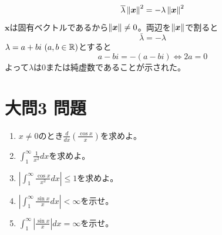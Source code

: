 \documentclass[dvipdfmx]{jsreport}
\begin{document}
\begin{souanswer}
\begin{enumerate}
\begin{equation*}
	\overline{\lambda}\left\|\bm{x}\right\|^2= -\lambda\left\|\bm{x}\right\|^2
\end{equation*}
	$\bm{x}$は固有ベクトルであるから$\left\|\bm{x}\right\|\ne 0$。両辺を$\left\|\bm{x}\right\|$で割ると
\begin{equation*}
	\bar{\lambda}= -\lambda
\end{equation*}
	$\lambda= a+ bi\ (a, b\in \mathbb{R})$とすると
\begin{equation*}
	a- bi= -(a- bi)\Leftrightarrow 2a= 0
\end{equation*}
	よって$\lambda$は0または純虚数であることが示された。
\end{enumerate}
\end{souanswer}

\section{大問3 問題}
\begin{tcolorbox} %
\begin{enumerate}
	\item $x\ne 0$のとき$\frac{d}{dx}\left(\frac{\cos{x}}{x}\right)$を求めよ。
	\item $\int_1^\infty \frac{1}{x^2}dx$を求めよ。
	\item $\left|\int_1^\infty \frac{\cos{x}}{x^2}dx\right|\le 1$を求めよ。
	\item $\left|\int_1^\infty \frac{\sin{x}}{x} dx\right|< \infty$を示せ。
	\item $\int_1^\infty \left|\frac{\sin{x}}{x}\right|dx= \infty$を示せ。	
\end{enumerate}
\end{tcolorbox}
\end{document}

